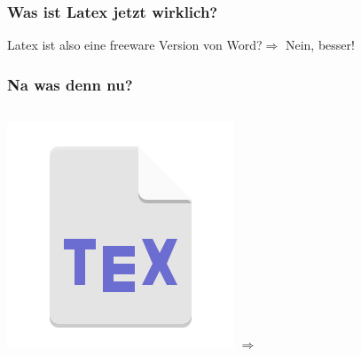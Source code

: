 \documentclass{beamer}
\begin{document}
\begin{frame}
\frametitle{Was ist Latex jetzt wirklich?}
     Latex ist also eine freeware Version von Word?\pause $\Rightarrow$ Nein, besser!
     
\end{frame}


\begin{frame}
     \frametitle{Na was denn nu?}
     \begin{columns}[c] %
          
     \includegraphics[width=\textwidth]{pictures/texicon.png}
     \Huge{$ \Rightarrow $}
          

\end{columns}
\end{frame}
\end{document}
